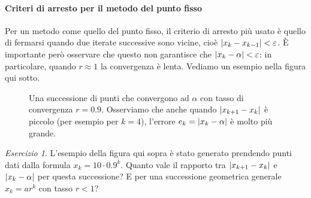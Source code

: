 \documentclass[a4paper]{report}
\DeclarePairedDelimiter{\abs}{\lvert}{\rvert}
\theoremstyle{definition}
\theoremstyle{remark}
\newtheorem{esercizio}[theorem]{Esercizio}
\begin{document}
\paragraph{Criteri di arresto per il metodo del punto fisso}

Per un metodo come quello del punto fisso, il criterio di arresto più usato è quello di fermarsi quando due iterate successive sono vicine, cioè $\abs{x_{k} - x_{k-1}} < \varepsilon$. È importante però osservare che questo non garantisce che $\abs{x_k - \alpha} < \varepsilon$: in particolare, quando $r \approx 1$ la convergenza è lenta. Vediamo un esempio nella figura qui sotto.

\begin{figure}[H]
\centering
    \caption{Una successione di punti che convergono ad $\alpha$ con tasso di convergenza $r = 0.9$. Osserviamo che anche quando $\abs{x_{k+1}-x_k}$ è piccolo (per esempio per $k=4$), l'errore $e_k = \abs{x_k-\alpha}$ è molto più grande.}
\end{figure}

\begin{esercizio}
    L'esempio della figura qui sopra è stato generato prendendo punti dati dalla formula $x_k = 10 \cdot 0.9^k$. Quanto vale il rapporto tra $\abs{x_{k+1}-x_k}$ e $\abs{x_k-\alpha}$ per questa successione? E per una successione geometrica generale $x_k = ar^k$ con tasso $r<1$?
\end{esercizio}



\end{document}
